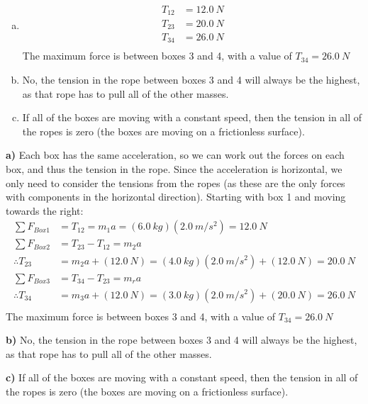 
\begin{finalanswer}
\begin{enumerate}[(a)]
\item \begin{align*}
T_{12}&=\SI{12.0}{N}\\
T_{23}&=\SI{20.0}{N}\\
T_{34}&= \SI{26.0}{N}\\
\end{align*}
The maximum force is between boxes 3 and 4, with a value of $T_{34}=\SI{26.0}{N}$
\item No, the tension in the rope between boxes 3 and 4 will always be the highest, as that rope has to pull all of the other masses.
\item If all of the boxes are moving with a constant speed, then the tension in all of the ropes is zero (the boxes are moving on a frictionless surface).
\end{enumerate}
\end{finalanswer}
\begin{solution}
\textbf{a)}
Each box has the same acceleration, so we can work out the forces on each box, and thus the tension in the rope. Since the acceleration is horizontal, we only need to consider the tensions from the ropes (as these are the only forces with components in the horizontal direction). Starting with box 1 and moving towards the right:
\begin{align*}
\sum{F_{Box 1}}&=T_{12}=m_1a=(\SI{6.0}{kg})(\SI{2.0}{m/s^2})=\SI{12.0}{N}\\
\sum{F_{Box 2}}&=T_{23}-T_{12}=m_2a\\
\therefore T_{23} &= m_2a+(\SI{12.0}{N})=(\SI{4.0}{kg})(\SI{2.0}{m/s^2})+(\SI{12.0}{N})=\SI{20.0}{N}\\
\sum{F_{Box 3}}&=T_{34}-T_{23}=m_ra \\
\therefore T_{34} &= m_3a+(\SI{12.0}{N})= (\SI{3.0}{kg})(\SI{2.0}{m/s^2})+(\SI{20.0}{N})=\SI{26.0}{N}\\
\end{align*}
The maximum force is between boxes 3 and 4, with a value of $T_{34}=\SI{26.0}{N}$

\textbf{b)}
No, the tension in the rope between boxes 3 and 4 will always be the highest, as that rope has to pull all of the other masses.

\textbf{c)}
If all of the boxes are moving with a constant speed, then the tension in all of the ropes is zero (the boxes are moving on a frictionless surface).
\end{solution}

